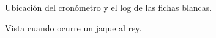 \documentclass[conference]{IEEEtran}
\begin{document}
    \begin{figure}[ht]
        \caption{Ubicación del cronómetro y el log de las fichas blancas.}
        \label{Ubicacion del cronometro y log}
    \end{figure}
    
    \begin{figure}[ht]
        \caption{Vista cuando ocurre un jaque al rey.}
        \label{Jaque al rey}
    \end{figure}
    
\end{document}
